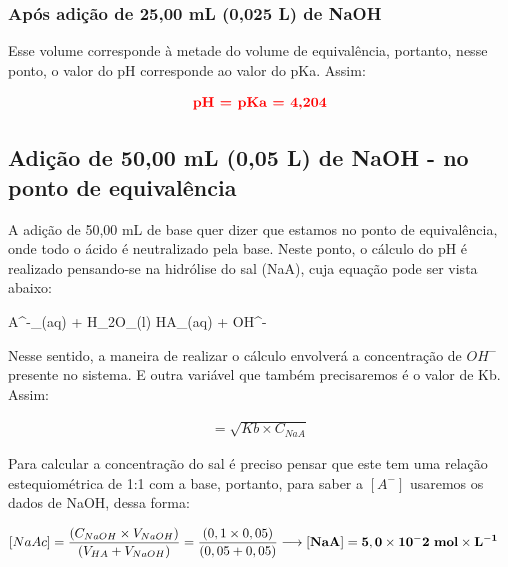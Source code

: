 \documentclass[a4paper, 12pt]{article}
\begin{document}
\subsubsection{Após adição de 25,00 mL (0,025 L) de NaOH}
Esse volume corresponde à metade do volume de equivalência, portanto, nesse ponto, o valor do pH corresponde ao valor do pKa. Assim:

\begin{fleqn}
	\begin{align*}
		 \textbf{\textcolor{red}{pH = pKa = 4,204}}
	\end{align*}
\end{fleqn}

\subsection{Adição de 50,00 mL (0,05 L) de NaOH - no ponto de equivalência}
A adição de 50,00 mL de base quer dizer que estamos no ponto de equivalência, onde todo o ácido é neutralizado pela base. Neste ponto, o cálculo do pH é realizado pensando-se na hidrólise do sal (NaA), cuja equação pode ser vista abaixo:

\begin{chemeqn}
	A^{-}_{(aq)} + H_{2}O_{(l)} \equilibarrow HA_{(aq)} + OH^-{} 
\end{chemeqn}

Nesse sentido, a maneira de realizar o cálculo envolverá a concentração de $OH^{-}$ presente no sistema. E outra variável que também precisaremos é o valor de Kb. Assim:

\begin{fleqn}
	\begin{align*}
		[OH^{-}] = \sqrt{Kb \times C_{NaA}}
	\end{align*}
\end{fleqn}

Para calcular a concentração do sal é preciso pensar que este tem uma relação estequiométrica de 1:1 com a base, portanto, para saber a $[A^{-}]$ usaremos os dados de NaOH, dessa forma:

	\begin{align*}
		&[NaAc] = \frac{ (C_{NaOH} \times V_{NaOH}) }{ (V_{HA} + V_{NaOH}) } = \frac{ (0,1 \times 0,05) }{ (0,05 + 0,05) } \longrightarrow	 \mathbf{[NaA] = 5,0 \times 10^-2 \text{ \textbf{mol}} \times L^{-1}}
	\end{align*}
\end{document}

